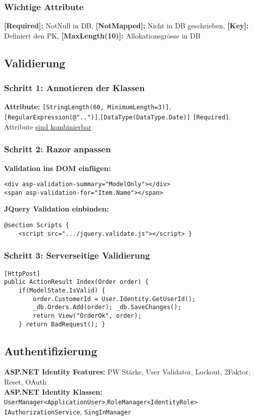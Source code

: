 \subsubsection{Wichtige Attribute}
\textbf{[Required]:} NotNull in DB,
\textbf{[NotMapped]:} Nicht in DB geschrieben,
\textbf{[Key]:} Definiert den PK,
\textbf{[MaxLength(10)]:} Allokationsgrösse in DB

\subsection{Validierung}

\subsubsection{Schritt 1: Annotieren der Klassen}
\textbf{Attribute:}
\texttt{\tiny [StringLength(60, MinimumLength=3)]},\\
\texttt{\tiny [RegularExpression(@"..")]},\texttt{\tiny [DataType(DataType.Date)]}
\texttt{\tiny [Required]}. Attribute \underline{sind kombinierbar}

\subsubsection{Schritt 2: Razor anpassen}
\textbf{Validation ins DOM einfügen:}
\begin{lstlisting}[style=CSharp]
<div asp-validation-summary="ModelOnly"></div>
<span asp-validation-for="Item.Name"></span>
\end{lstlisting}
\textbf{JQuery Validation einbinden:}
\begin{lstlisting}[style=CSharp]
@section Scripts {
    <script src=".../jquery.validate.js"></script> }
\end{lstlisting}

\subsubsection{Schritt 3: Serverseitige Validierung}
\begin{lstlisting}[style=CSharp]
[HttpPost]
public ActionResult Index(Order order) {
    if(ModelState.IsValid) {
        order.CustomerId = User.Identity.GetUserId();
        _db.Orders.Add(order); _db.SaveChanges();
        return View("OrderOk", order);
    } return BadRequest(); }
\end{lstlisting}

\subsection{Authentifizierung}
\textbf{ASP.NET Identity Features:} PW Stärke, User Validator, Lockout, 2Faktor, Reset, OAuth\\
\textbf{ASP.NET Identity Klassen:}\\
\texttt{\tiny UserManager<ApplicationUser>},\texttt{\tiny RoleManager<IdentityRole>}
\texttt{\tiny IAuthorizationService},
\texttt{\tiny SingInManager}

